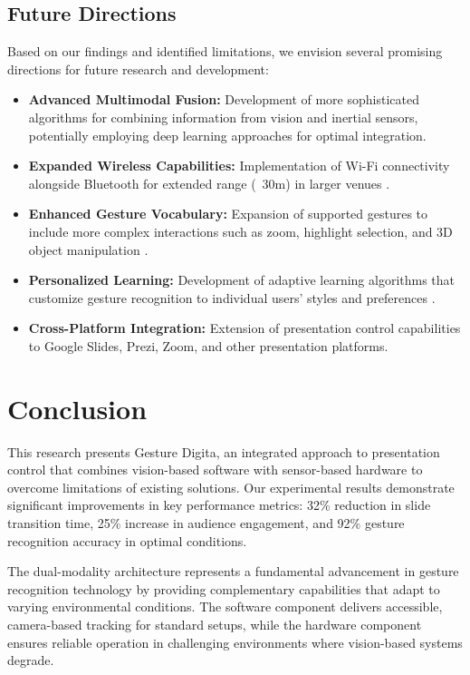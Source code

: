 \documentclass[arxiv,usenatbib]{iupartex}
\begin{document}
\subsection{Future Directions}
Based on our findings and identified limitations, we envision several promising directions for future research and development:

\begin{itemize}
  \item \textbf{Advanced Multimodal Fusion:} Development of more sophisticated algorithms for combining information from vision and inertial sensors, potentially employing deep learning approaches for optimal integration.
  
  \item \textbf{Expanded Wireless Capabilities:} Implementation of Wi-Fi connectivity alongside Bluetooth for extended range (~30m) in larger venues \cite{Li2023}.
  
  \item \textbf{Enhanced Gesture Vocabulary:} Expansion of supported gestures to include more complex interactions such as zoom, highlight selection, and 3D object manipulation \cite{Lee2019}.
  
  \item \textbf{Personalized Learning:} Development of adaptive learning algorithms that customize gesture recognition to individual users' styles and preferences \cite{Chen2024}.
  
  \item \textbf{Cross-Platform Integration:} Extension of presentation control capabilities to Google Slides, Prezi, Zoom, and other presentation platforms.
\end{itemize}

\section{Conclusion}
This research presents Gesture Digita, an integrated approach to presentation control that combines vision-based software with sensor-based hardware to overcome limitations of existing solutions. Our experimental results demonstrate significant improvements in key performance metrics: 32\% reduction in slide transition time, 25\% increase in audience engagement, and 92\% gesture recognition accuracy in optimal conditions.

The dual-modality architecture represents a fundamental advancement in gesture recognition technology by providing complementary capabilities that adapt to varying environmental conditions. The software component delivers accessible, camera-based tracking for standard setups, while the hardware component ensures reliable operation in challenging environments where vision-based systems degrade.
\end{document}
